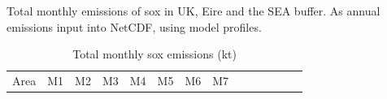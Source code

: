 \documentclass[
]{article}
\begin{document}
Total monthly emissions of sox in UK, Eire and the SEA buffer. As annual
emissions input into NetCDF, using model profiles.

\begin{longtable}[]{@{}
  >{\raggedleft\arraybackslash}p{}
  >{\centering\arraybackslash}p{}
  >{\centering\arraybackslash}p{}
  >{\centering\arraybackslash}p{}
  >{\centering\arraybackslash}p{}
  >{\centering\arraybackslash}p{}
  >{\centering\arraybackslash}p{}
  >{\centering\arraybackslash}p{}
  >{\centering\arraybackslash}p{}
  >{\centering\arraybackslash}p{}
  >{\centering\arraybackslash}p{}
  >{\centering\arraybackslash}p{}
  >{\centering\arraybackslash}p{}
  >{\centering\arraybackslash}p{}@{}}
\caption{Total monthly sox emissions (kt)}\tabularnewline
\toprule\noalign{}
\begin{minipage}[b]{\linewidth}\raggedleft
Area
\end{minipage} & \begin{minipage}[b]{\linewidth}\centering
M1
\end{minipage} & \begin{minipage}[b]{\linewidth}\centering
M2
\end{minipage} & \begin{minipage}[b]{\linewidth}\centering
M3
\end{minipage} & \begin{minipage}[b]{\linewidth}\centering
M4
\end{minipage} & \begin{minipage}[b]{\linewidth}\centering
M5
\end{minipage} & \begin{minipage}[b]{\linewidth}\centering
M6
\end{minipage} & \begin{minipage}[b]{\linewidth}\centering
M7
\end{minipage} & \begin{minipage}[b]{\linewidth}\centering

\end{minipage}
\end{longtable}
\end{document}
